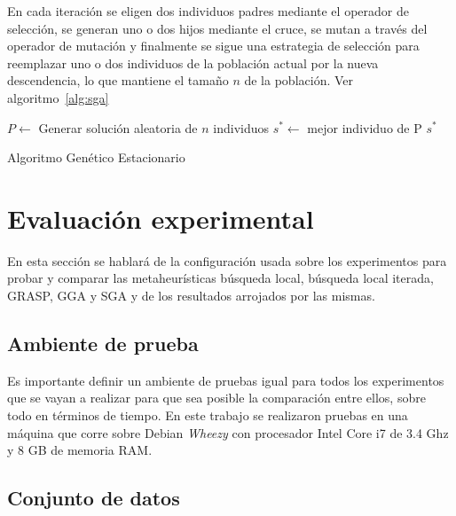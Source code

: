 \documentclass{ci5652}
\begin{document}
En cada iteración se eligen dos individuos padres mediante el operador de selección, se generan uno o dos hijos mediante el cruce, se mutan a través del operador de mutación y finalmente se sigue una estrategia de selección para reemplazar uno o dos individuos de la población actual por la nueva descendencia, lo que mantiene el tamaño $n$ de la población. Ver algoritmo~\ref{alg:sga}


\begin{algorithm}[!h]
    \DontPrintSemicolon
    \vspace*{0.1cm}

	$P \leftarrow $ Generar solución aleatoria de $n$ individuos\;
	$s^{*} \leftarrow $ mejor individuo de P\;
	\Return $s^{*}$    
    \vspace*{0.1cm}
    \caption{Algoritmo Genético Estacionario}
    \label{alg:sga}
\end{algorithm}
\section{Evaluación experimental}
En esta sección se hablará de la configuración usada sobre los experimentos para probar y comparar las metaheurísticas búsqueda local, búsqueda local iterada, GRASP, GGA y SGA y de los resultados arrojados por las mismas.

\subsection{Ambiente de prueba}
Es importante definir un ambiente de pruebas igual para todos los experimentos que se vayan a realizar para que sea posible la comparación entre ellos, sobre todo en términos de tiempo. En este trabajo se realizaron pruebas en una máquina que corre sobre Debian \textit{Wheezy} con procesador Intel Core i7 de 3.4 Ghz y 8 GB de memoria RAM. 
\subsection{Conjunto de datos}
	
\end{document}
